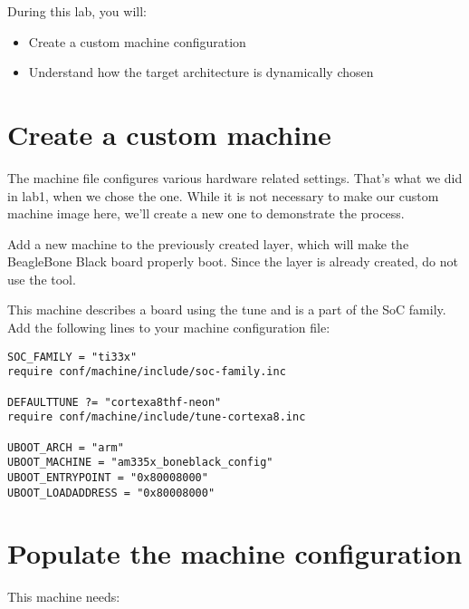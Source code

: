
During this lab, you will:
\begin{itemize}
  \item Create a custom machine configuration
  \item Understand how the target architecture is dynamically chosen
\end{itemize}

\section{Create a custom machine}

The machine file configures various hardware related settings. That's
what we did in lab1, when we chose the  one. While it
is not necessary to make our custom machine image here, we'll create a
new one to demonstrate the process.

Add a new  machine to the previously created layer, which
will make the BeagleBone Black board properly boot. Since the
 layer is already created, do not use the
 tool.

This machine describes a board using the  tune
and is a part of the  SoC family. Add the following lines
to your machine configuration file:

\begin{verbatim}
SOC_FAMILY = "ti33x"
require conf/machine/include/soc-family.inc

DEFAULTTUNE ?= "cortexa8thf-neon"
require conf/machine/include/tune-cortexa8.inc

UBOOT_ARCH = "arm"
UBOOT_MACHINE = "am335x_boneblack_config"
UBOOT_ENTRYPOINT = "0x80008000"
UBOOT_LOADADDRESS = "0x80008000"
\end{verbatim}

\section{Populate the machine configuration}

This  machine needs:

